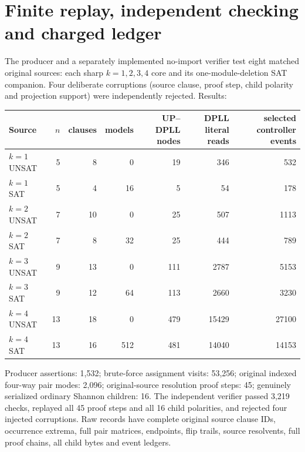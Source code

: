 \documentclass[11pt]{article}
\begin{document}
\section{Finite replay, independent checking and charged ledger}
The producer and a separately implemented no-import verifier test
eight matched original sources: each sharp $k=1,2,3,4$ core and its
one-module-deletion SAT companion. Four deliberate corruptions
(source clause, proof step, child polarity and projection support)
were independently rejected. Results:
\begin{center}
\begin{tabular}{lrrrrrr}
\toprule
Source & $n$ & clauses & models & UP--DPLL nodes &
DPLL literal reads & selected controller events\\
\midrule
$k=1$ UNSAT &5&8&0&19&346&532\\
$k=1$ SAT   &5&4&16&5&54&178\\
$k=2$ UNSAT &7&10&0&25&507&1113\\
$k=2$ SAT   &7&8&32&25&444&789\\
$k=3$ UNSAT &9&13&0&111&2787&5153\\
$k=3$ SAT   &9&12&64&113&2660&3230\\
$k=4$ UNSAT &13&18&0&479&15429&27100\\
$k=4$ SAT   &13&16&512&481&14040&14153\\
\bottomrule
\end{tabular}
\end{center}
Producer assertions: 1,532; brute-force assignment visits: 53,256;
original indexed four-way pair modes: 2,096; original-source resolution
proof steps: 45; genuinely serialized ordinary Shannon children: 16.
The independent verifier passed 3,219 checks, replayed all 45 proof
steps and all 16 child polarities, and rejected four injected
corruptions. Raw records have complete original source clause IDs,
occurrence extrema, full pair matrices, endpoints, flip trails,
source resolvents, full proof chains, all child bytes and event ledgers.
\end{document}
